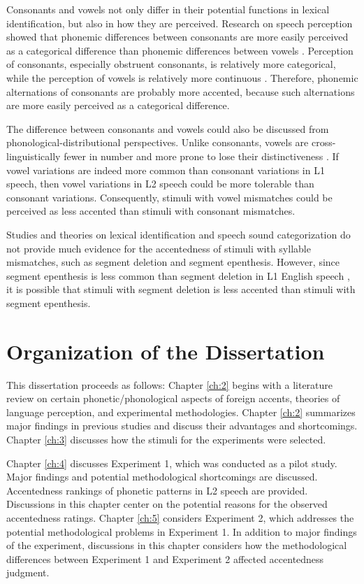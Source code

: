 Consonants and vowels not only differ in their potential functions in lexical identification, but also in how they are perceived. Research on speech perception showed that phonemic differences between consonants are more easily perceived as a categorical difference than phonemic differences between vowels \citep{Altmann_2014, Kronrod_2012}. Perception of consonants, especially obstruent consonants, is relatively more categorical, while the perception of vowels is relatively more continuous \citep{Altmann_2014, Kronrod_2012}. Therefore, phonemic alternations of consonants are probably more accented, because such alternations are more easily perceived as a categorical difference. 

The difference between consonants and vowels could also be discussed from phonological-distributional perspectives. Unlike consonants, vowels are cross-linguistically fewer in number and more prone to lose their distinctiveness \citep{Nespor_2003}. If vowel variations are indeed more common than consonant variations in L1 speech, then vowel variations in L2 speech could be more tolerable than consonant variations. Consequently, stimuli with vowel mismatches could be perceived as less accented than stimuli with consonant mismatches. 

Studies and theories on lexical identification and speech sound categorization do not provide much evidence for the accentedness of stimuli with syllable mismatches, such as segment deletion and segment epenthesis. However, since segment epenthesis is less common than segment deletion in L1 English speech \citep{Johnson_2004a}, it is possible that stimuli with segment deletion is less accented than stimuli with segment epenthesis.


\section{Organization of the Dissertation}

This dissertation proceeds as follows: Chapter \ref{ch:2} begins with a literature review on certain phonetic/phonological aspects of foreign accents, theories of language perception, and experimental methodologies. Chapter \ref{ch:2} summarizes major findings in previous studies and discuss their advantages and shortcomings.  Chapter \ref{ch:3} discusses how the stimuli for the experiments were selected. 

Chapter \ref{ch:4} discusses Experiment 1, which was conducted as a pilot study. Major findings and potential methodological shortcomings are discussed. Accentedness rankings of phonetic patterns in L2 speech are provided. Discussions in this chapter center on the potential reasons for the observed accentedness ratings. Chapter \ref{ch:5} considers Experiment 2, which addresses the potential methodological problems in Experiment 1. In addition to major findings of the experiment, discussions in this chapter considers how the methodological differences between Experiment 1 and Experiment 2 affected accentedness judgment. 


